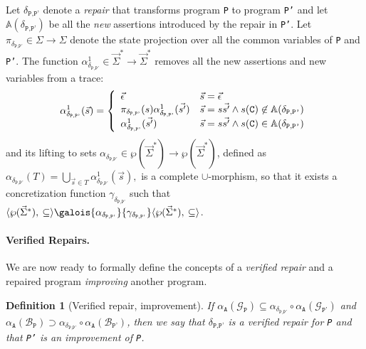 \documentclass[10pt]{sigplanconf}
\newtheorem{definition}{Definition}
\newcommand{\labelDef}[1]{\label{def:#1}}
\newcommand{\code}[1]{\texttt{#1}}
\newcommand{\ltuple}[1]{\langle#1,\allowbreak}
\newcommand{\rtuple}[1]{\:#1\rangle}
\newcommand{\pair}[2]{\ltuple{#1}\rtuple{#2}}
\newcommand{\diff}[2]{\delta_{\code{#1}, \code{#2}}}
\newcommand{\emptytrace}{\vec{\epsilon}}
\begin{document}
Let $\diff{P}{P'}$ denote a {\em repair} that transforms program
\code{P} to program \code{P'} and let $\mathbb{A}(\diff{P}{P'})$ be 
all the \emph{new} assertions introduced by the
repair in \code{P'}. Let $\pi_{\diff{P}{P'}} \in \Sigma \rightarrow
\Sigma$ denote the state projection over all the common variables of \code{P} and \code{P'}.
The function $\alpha^1_{\diff{P}{P'}} \in \vec{\Sigma}^\ast
\rightarrow \vec{\Sigma}^\ast$ removes all the new assertions and
new variables from a trace:
\[
\alpha^1_{\diff{P}{P'}}(\vec{s}) = \left\{
\begin{array}{l l}
  \emptytrace                 & \vec{s} = \emptytrace \\
  \pi_{\diff{P}{P'}}(s)\alpha^1_{\diff{P}{P'}}(\vec{s'}) & \vec{s} = s\vec{s'} \wedge s(\code{C}) \not \in \mathbb{A}(\diff{P}{P'}) \\
  \alpha^1_{\diff{P}{P'}}(\vec{s'})  &  \vec{s} = s\vec{s'} \wedge s(\code{C}) \in \mathbb{A}(\diff{P}{P'}) \\
\end{array}
\right.
\]
and its lifting to sets  $\alpha_{\diff{P}{P'}} \in  \wp(\vec{\Sigma}^\ast) \rightarrow \wp(\vec{\Sigma}^\ast)$, defined as 
\(
\alpha_{\diff{P}{P'}}(T) = \bigcup_{\vec{s} \in T} \alpha^1_{\diff{P}{P'}}(\vec{s}),
\)
is a complete $\cup$-morphism, so that it exists a concretization function $\gamma_{\diff{P}{P'}}$ such that $\pair{\wp(\vec{\Sigma}^\ast)}{\subseteq}\galois{{\alpha_{\diff{P}{P'}}}}{{\gamma_{\diff{P}{P'}}}}\pair{\wp(\vec{\Sigma}^\ast)}{\subseteq}$.

\paragraph{Verified Repairs.}
We are now ready to formally define the concepts of a {\em verified
repair} and a repaired program {\em improving} another program.

\begin{definition}[Verified repair, improvement]
\labelDef{SemanticFixes}
If $\alpha_\code{A}(\mathcal{G}_\code{P}) \subseteq \alpha_{\diff{P}{P'}} \circ \alpha_\code{A}(\mathcal{G}_\code{P'})$ and 
$\alpha_\code{A}(\mathcal{B}_\code{P}) \supset \alpha_{\diff{P}{P'}} \circ \alpha_\code{A}(\mathcal{B}_\code{P'})$, then we say that  $\diff{P}{P'}$ is a verified repair for \code{P} and that \code{P'} is an improvement of \code{P}.
\end{definition}
\end{document}
